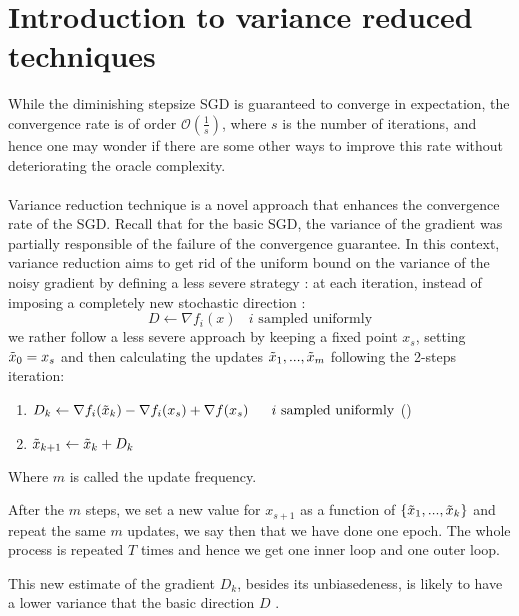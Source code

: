 \documentclass[12pt]{report}
\begin{document}
\section{Introduction to variance reduced techniques}
While the diminishing stepsize SGD is guaranteed to converge in expectation, the convergence rate is of order $\mathcal{O}(\frac{1}{s})$,  where $s$ is the number of iterations, and hence one may wonder if there are some other ways to improve this rate without deteriorating the oracle complexity.\\
\\Variance reduction technique is a novel approach that enhances the convergence rate of the SGD. Recall that for the basic SGD, the variance of the gradient was partially responsible of the failure of the convergence guarantee. In this context, variance reduction aims to get rid of the uniform bound on the variance of the noisy gradient by defining a less severe strategy : at each iteration, instead of imposing a completely new stochastic direction :
$$D\gets \nabla f_i(x)\ \ \ \ i\text{\ sampled\ uniformly}$$
we rather follow a less severe approach by keeping a fixed point $x_s$, setting $\Tilde{x}_0=x_s$ and then calculating the updates $\Tilde{x}_1,...,\Tilde{x}_m$ following the 2-steps iteration:



\begin{enumerate} 
    \item  $D_k\gets \nabla f_i(\Tilde{x}_k)-\nabla f_i(x_s)+\nabla f(x_s)\ \ \ \ \ i\text{\ sampled\ uniformly}$ 
    \hfill{}(\theequation)

    \item $\Tilde{x}_{k+1}\gets \Tilde{x}_k + D_k$
\end{enumerate}




Where $m$ is called the update frequency.

After the $m$ steps, we set a new value for $x_{s+1}$ as a function of $\{\Tilde{x}_1,...,\Tilde{x}_k\}$  and repeat the same $m$ updates, we say then that we have done one epoch. The whole process is repeated $T$ times and hence we get one inner loop and one outer loop.

This new estimate of the gradient $D_k$, besides its unbiasedeness, is likely to have a lower variance that the basic direction $D$ \cite{allen2017katyusha}.
\end{document}
